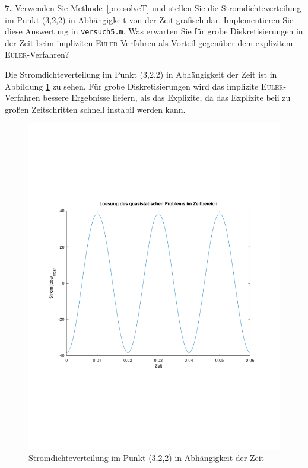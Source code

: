 \documentclass[Protokollheft.tex]{subfiles}
\begin{document}
\begin{framed}
	\noindent \textbf{7.} Verwenden Sie Methode~\eqref{pro:solveT} und stellen Sie die Stromdichteverteilung im Punkt (3,2,2) in Abhängigkeit von der Zeit grafisch dar. Implementieren Sie diese Auswertung in \lstinline{versuch5.m}. Was erwarten Sie für grobe Diskretisierungen in der Zeit beim impliziten \textsc{Euler}-Verfahren als Vorteil gegenüber dem explizitem \textsc{Euler}-Verfahren?\label{exer:currDensityTimeDependent}
\end{framed}
Die Stromdichteverteilung im Punkt (3,2,2) in Abhängigkeit der Zeit ist in Abbildung \ref{fig:Stromdichte_punkt} zu sehen. Für grobe Diskretisierungen wird das implizite \textsc{Euler}-Verfahren bessere Ergebnisse liefern, als das Explizite, da das Explizite beii zu großen Zeitschritten schnell instabil werden kann.
\begin{figure}[h]
	\centering
	\includegraphics[trim = 15mm 65mm 15mm 65mm, clip,width=0.7\linewidth]{Stromdichte_punkt.pdf}
	\caption{Stromdichteverteilung im Punkt (3,2,2) in Abhängigkeit der Zeit}
	\label{fig:Stromdichte_punkt}
\end{figure}
\end{document}
